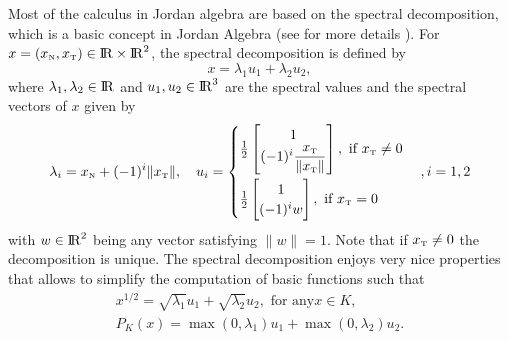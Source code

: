 Most of the calculus in Jordan algebra are based on the spectral decomposition, which is a basic concept in Jordan Algebra (see for more details \cite{Fukushima.ea2001}). For $x = (x_{\hbox{\tiny{N}}}, x_{\hbox{\tiny{T}}})\in \mathrm{I\!R}\times \mathrm{I\!R}^2$, the spectral decomposition is defined by
\begin{equation}
  \label{eq:Jordan-spectraldecomposition}
  x = \lambda_1 u_1 + \lambda_2 u_2,
\end{equation}
where $\lambda_1,\lambda_2\in \mathrm{I\!R}$ and $u_1,u_2\in\mathrm{I\!R}^3$ are the spectral values and the spectral vectors of $x$ given by
\begin{equation}
  \label{eq:Jordan-spectraldecomposition1}
    \lambda_i= x_\n + (-1)^i \|x_\t\|, \quad
    u_i =
    \begin{cases}
      \frac{1}{2}
      \begin{bmatrix}
        1 \\
        (-1)^i \Frac{x_\t}{\|x_\t\|}
      \end{bmatrix}, \text{ if } x_\t\neq 0 \\[5mm]
       \frac{1}{2}
      \begin{bmatrix}
        1 \\
        (-1)^i w
      \end{bmatrix}, \text{ if } x_\t = 0 \\
    \end{cases}, i = 1,2
\end{equation}
with $w\in\mathrm{I\!R}^2$ being any vector satisfying $\|w\|=1$. Note that if $x_{\hbox{\tiny{T}}}\neq 0$ the decomposition is unique. The spectral decomposition enjoys very nice properties that  allows to simplify  the computation of basic functions such that
\begin{equation}
  \label{eq:Jordan-spectraldecomposition2}
  \begin{array}{l}
    x^{1/2} = \sqrt{\lambda_1} u_1 + \sqrt{\lambda_2} u_2, \text{ for any}  x \in K, \\[1mm]
    P_K(x) = \max(0,\lambda_1) u_1 + \max(0,\lambda_2) u_2. 
  \end{array}
\end{equation}




